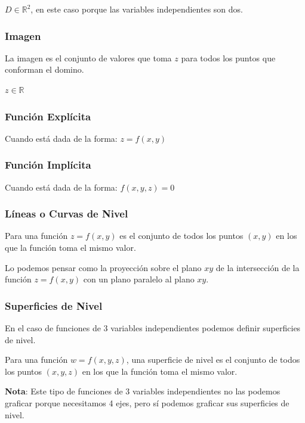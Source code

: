 \documentclass[12pt]{article}
\begin{document}
$ D \in \mathbb{R}^{2} $, en este caso porque las variables independientes son dos.

\subsubsection*{Imagen}
La imagen es el conjunto de valores que toma $ z $ para todos los puntos que conforman el domino.

$ z \in \mathbb{R}^{} $

\subsubsection*{Función Explícita}
Cuando está dada de la forma: $ z = f(x,y) $

\subsubsection*{Función Implícita}
Cuando está dada de la forma: $ f(x,y,z) = 0 $

\subsubsection{Líneas o Curvas de Nivel}
Para una función $ z = f(x,y) $ es el conjunto de todos los puntos $ (x,y) $ en los que la función toma el mismo valor.

Lo podemos pensar como la proyección sobre el plano $ xy $ de la intersección de la función $ z = f(x,y) $ con un plano paralelo al plano $ xy $.

\subsubsection{Superficies de Nivel}
En el caso de funciones de 3 variables independientes podemos definir superficies de nivel.

Para una función $ w = f(x,y,z) $, una superficie de nivel es el conjunto de todos los puntos $ (x,y,z) $ en los que la función toma el mismo valor.

\textbf{Nota}: Este tipo de funciones de 3 variables independientes no las podemos graficar porque necesitamos 4 ejes, pero sí podemos graficar sus superficies de nivel.
\end{document}
